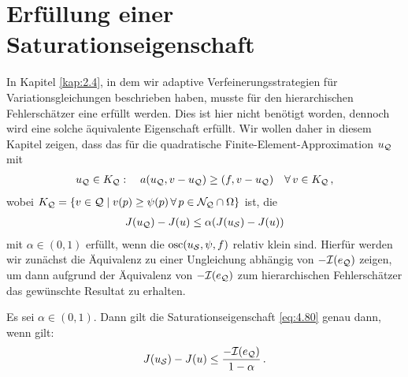 \section{Erfüllung einer Saturationseigenschaft}
\label{kap:4.3}

In Kapitel \ref{kap:2.4}, in dem wir adaptive Verfeinerungsstrategien für Variationsgleichungen beschrieben haben, musste für den hierarchischen Fehlerschätzer eine  erfüllt werden. Dies ist hier nicht benötigt worden, dennoch wird eine solche äquivalente Eigenschaft erfüllt. Wir wollen daher in diesem Kapitel zeigen, dass das für die quadratische Finite-Element-Approximation $u_{\mathcal Q}$ mit
\begin{align}\label{eq:4.79}
	u_{\mathcal Q} \in K_{\mathcal Q} : \quad a(u_{\mathcal Q}, v-u_{\mathcal Q}) \ge (f,v-u_{\mathcal Q}) \quad \forall \, v \in K_{\mathcal Q} \, ,
\end{align}
wobei $K_{\mathcal Q} = \{v \in \mathcal Q \mid v(p)\ge \psi(p) \, \forall \, p \in \mathcal N_{\mathcal Q} \cap \Omega\}$ ist, die 
\begin{align}\label{eq:4.80}
	J(u_{\mathcal Q})-J(u) \le \alpha (J(u_{\mathcal S})-J(u))
\end{align}
mit $\alpha \in (0,1)$ erfüllt, wenn die  $\operatorname{osc} (u_{\mathcal S},\psi,f)$ relativ klein sind. Hierfür werden wir zunächst die Äquivalenz zu einer Ungleichung abhängig von $-\mathcal I(e_{\mathcal Q})$ zeigen, um dann aufgrund der Äquivalenz von $-\mathcal I(e_{\mathcal Q})$ zum hierarchischen Fehlerschätzer das gewünschte Resultat zu erhalten.


\begin{lemma}\label{lem:4.26}
Es sei $\alpha \in (0,1)$. Dann gilt die Saturationseigenschaft \eqref{eq:4.80} genau dann, wenn gilt:
\begin{align}\label{eq:4.81}
	J(u_{\mathcal S}) - J(u) \le \frac{-\mathcal I (e_{\mathcal Q})}{1-\alpha} \, .
\end{align}
\end{lemma}

